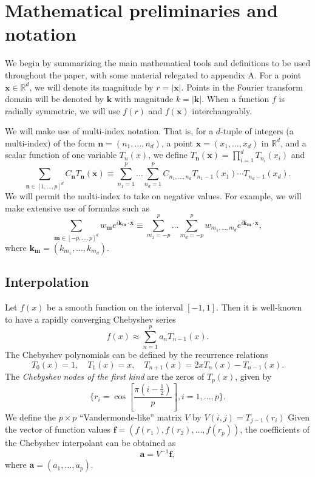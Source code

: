\documentclass[final,letterpaper]{siamart171218}
\newcommand{\x}{\boldsymbol{x}}
\newcommand{\bk}{\boldsymbol{k}}
\newcommand{\bm}{\boldsymbol{m}}
\newcommand{\bn}{\boldsymbol{n}}
\newcommand{\bfa}{\boldsymbol{a}}
\newcommand{\bff}{\boldsymbol{f}}
\begin{document}
\section{Mathematical preliminaries and notation}

We begin by summarizing the main mathematical tools and definitions to
be used throughout the paper, with some material relegated to
appendix A.
For a point $\x \in \mathbb{R}^d$, we will denote its magnitude by 
$r=|\x|$.  Points in the Fourier transform domain will be denoted by 
$\bk$ with magnitude $k=|\bk|$. When a function $f$ is radially symmetric,
we will use $f(r)$ and $f(\x)$ interchangeably.

We will make use of multi-index notation. That is, for a $d$-tuple
of integers (a multi-index)
of the form
$\bn=(n_1,\ldots,n_d)$, 
a point $\x = (x_1,\dots,x_d)$ in $\mathbb{R}^d$, and a scalar
function of one variable $T_n(x)$, we define
$T_{\bn}(\x)=\prod_{i=1}^d T_{n_i}(x_i)$ and
\[ 
 \sum_{\bn \in [1,\dots,p]^d} C_{\bn} T_{\bn}(\x) \equiv
 \sum_{n_1 = 1}^{p} 
 \dots \sum_{n_d = 1}^{p} 
C_{n_1,\dots,n_d} T_{n_1-1}(x_1) \cdots T_{n_d-1}(x_d).
\]
We will permit the multi-index to take on negative values. For example,
we will make extensive use of formulas such as
\[ 
 \sum_{\bm \in [-p,\dots,p]^d} w_{\bm} e^{i \bk_{\bm} \cdot \x} \equiv
 \sum_{m_1 = -p}^{p} 
 \dots \sum_{m_d = -p}^{p} 
w_{m_1,\dots,m_d} e^{i \bk_{\bm} \cdot \x},
\]
where $\bk_{\bm} = (k_{m_1},\dots,k_{m_d})$.

\subsection{Interpolation} \label{sec:interp}

Let $f(x)$ be a smooth function on the interval $[-1,1]$.
Then it is well-known to have a rapidly converging Chebyshev series
\cite{boyd2000,trefethenatap}
\[ 
f(x) \approx \sum_{n=1}^{p} a_n T_{n-1}(x).
\]
The Chebyshev polynomials \cite{boyd2000,trefethen2000} can be defined by 
the recurrence relations
\[ T_0(x) = 1,\quad T_1(x) = x,\quad T_{n+1}(x) = 2x T_n(x) - T_{n-1}(x).  \]
The {\em Chebyshev nodes of the first kind} are the zeros of $T_p(x)$, given by 
\[ 
\{ r_i =  \cos \left[  \frac{\pi (i-\frac{1}{2})}{p} \right], i = 1,\dots,p \}.
\]
We define the $p \times p$ ``Vandermonde-like'' matrix $V$ by $V(i,j) = T_{j-1}(r_i)$
\cite{higham1990}
Given the vector of function values $\bff = (f(r_1),f(r_2),\dots,f(r_p))$,
the coefficients of the Chebyshev interpolant can be obtained as
\[ \bfa = V^{-1} \bff ,  \]
where $\bfa = (a_1,\dots,a_p)$.
\end{document}
